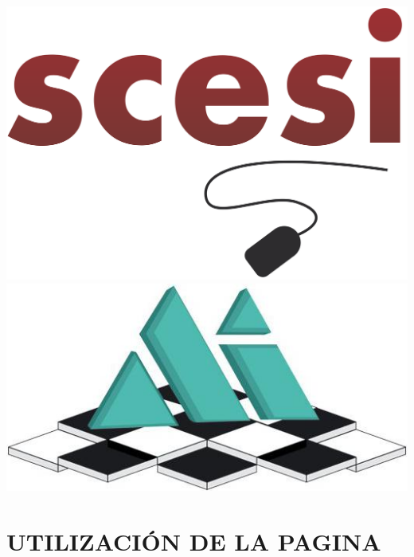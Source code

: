 \documentclass[12pt,letterpaper,oneside]{book}
\begin{document}
\begin{titlepage}
	\noindent\small{\hspace{1.15cm}\includegraphics[scale=0.06]{img/scesi2.png} \hfill \includegraphics[scale=0.23]{img/memi.jpg}\hspace{0.83cm}}
\end{titlepage}
\thispagestyle{empty}
\begin{center}
\end{center}

\tableofcontents
\chapter{UTILIZACIÓN DE LA PAGINA}
\end{document}
